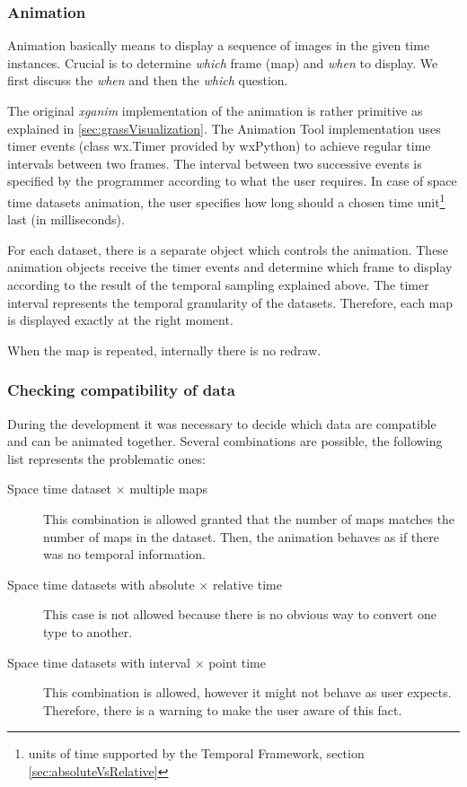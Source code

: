 \documentclass[a4paper,12pt,oneside]{book}
\newcommand{\module}[1]{\textsl{#1}}
\newcommand{\tf}{Temporal Framework\xspace}
\newcommand{\at}{Animation Tool\xspace}
\begin{document}
\subsubsection{Animation}
Animation basically means to display a sequence of images in the given time instances.
Crucial is to determine \emph{which} frame (map) and \emph{when} to display.
We first discuss the \emph{when}  and then the \emph{which} question.


The original \module{xganim} implementation of the animation is rather primitive
as explained in \ref{sec:grassVisualization}.
The \at implementation uses timer events (class wx.Timer provided by wxPython) to achieve regular time intervals between two frames.
The interval between two successive events is specified by the programmer according to what the user requires.
In case of space time datasets animation, the user specifies how long
should a chosen time unit\footnote{units of time supported by the \tf, section \ref{sec:absoluteVsRelative}}
last (in milliseconds).

For each dataset, there is a separate object which controls the animation.
These animation objects receive the timer events and determine
which frame to display according to the result of the temporal sampling explained above.
The timer interval represents the temporal granularity of the datasets.
Therefore, each map is displayed exactly at the right moment.

When the map is repeated, internally there is no redraw.



\subsubsection{Checking compatibility of data}
During the development it was necessary to decide which data are compatible and can be animated together.
Several combinations are possible, the following list represents the problematic ones:
\begin{description}
  \item[Space time dataset $\times$ multiple maps]
  This combination is allowed granted that the number of maps matches the number of maps in the dataset.
  Then, the animation behaves as if there was no temporal information.

  \item[Space time datasets with absolute $\times$ relative time]
  This case is not allowed because there is no obvious way to convert one type to another.

  \item[Space time datasets with interval $\times$ point time]
  This combination is allowed, however it might not behave as user expects.
  Therefore, there is a warning to make the user aware of this fact.
 \end{description}
 
\end{document}
